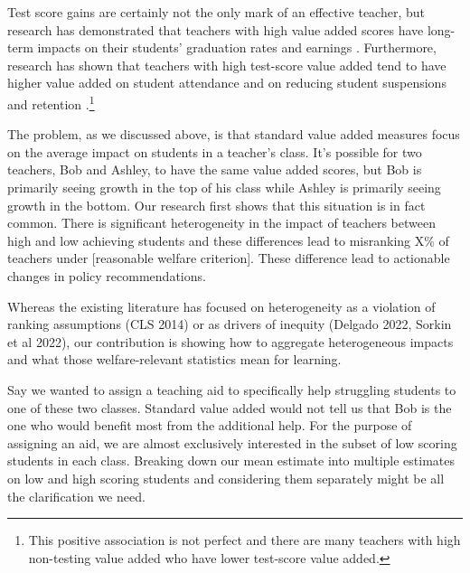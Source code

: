 \documentclass{article}
\theoremstyle{definition}
\theoremstyle{definition}
\theoremstyle{definition}
\begin{document}
Test score gains are certainly not the only mark of an effective teacher, but research has demonstrated that teachers with high value added scores have long-term impacts on their students' graduation rates and earnings \citep{chetty2014measuring2}. Furthermore, research has shown that teachers with high test-score value added tend to have higher value added on student attendance and on reducing student suspensions and retention \citep{pope2017multidimensional}.\footnote{This positive association is not perfect and there are many teachers with high non-testing value added who have lower test-score value added.} 

The problem, as we discussed above, is that standard value added measures focus on the average impact on students in a teacher's class. It’s possible for two teachers, Bob and Ashley, to have the same value added scores, but Bob is primarily seeing growth in the top of his class while Ashley is primarily seeing growth in the bottom. Our research first shows that this situation is in fact common. There is significant heterogeneity in the impact of teachers between high and low achieving students and these differences lead to misranking X\% of teachers under [reasonable welfare criterion]. These difference lead to actionable changes in policy recommendations. 

Whereas the existing literature has focused on heterogeneity as a violation of ranking assumptions (CLS 2014) or as drivers of inequity (Delgado 2022, Sorkin et al 2022), our contribution is showing how to aggregate heterogeneous impacts and what those welfare-relevant statistics mean for learning.

Say we wanted to assign a teaching aid to specifically help struggling students to one of these two classes. Standard value added would not tell us that Bob is the one who would benefit most from the additional help. For the purpose of assigning an aid, we are almost exclusively interested in the subset of low scoring students in each class. Breaking down our mean estimate into multiple estimates on low and high scoring students and considering them separately might be all the clarification we need. 
\end{document}
